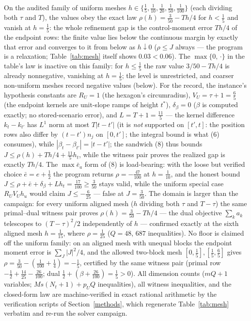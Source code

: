 \documentclass[10pt,twocolumn]{article}
\theoremstyle{plain}
\theoremstyle{definition}
\theoremstyle{remark}
\begin{document}
On the audited family of uniform meshes \(h \in \{\tfrac15,
\tfrac1{10}, \tfrac1{20}, \tfrac1{50}, \tfrac1{100}\}\) (each dividing
both \(\tau\) and \(T\)), the values obey the exact law \(\rho(h) =
\tfrac{3}{50} - Th/4\) for \(h < \tfrac15\) and vanish at \(h =
\tfrac15\): the whole refinement gap is the control-moment error \(Th/4\)
of the endpoint rows: the finite value lies below the continuous margin by
exactly that error and converges to it from below as \(h \downarrow 0\)
(\(\rho \le J\) always --- the program is a relaxation; Table~\ref{tab:mesh}
itself shows \(0.03 < 0.06\)). The \(\max\{0,\,\cdot\}\) in the
table's law is inactive on this family: for \(h \le \tfrac15\) the raw
value \(3/50 - Th/4\) is already nonnegative, vanishing at
\(h = \tfrac15\); the level is unrestricted, and coarser non-uniform
meshes record negative values (below).
For the record, the instance's hypothesis constants are
\(R_U = 1\) (the hexagon's circumradius), \(V_U = \tau + 1 = \tfrac65\)
(the endpoint kernels are unit-slope ramps of height \(t^{*}\)),
\(\delta_\beta = 0\) (\(\beta\) is computed exactly; no stored-scenario
error), and \(L = T + 1 = \tfrac{11}{5}\) --- the kernel difference \(k_t - k_{t'}\) has \(L^1\) norm at most
\(T|t - t'|\) (it is \emph{not} supported on \([t', t]\): the position
rows also differ by \((t - t')n_j\) on \([0, t']\); the integral bound is
what (6) consumes), while \(|\beta_t - \beta_{t'}| = |t - t'|\); the
sandwich (8) thus bounds \(J \le \rho(h) + Th/4 + \tfrac{11}{5}
h_t\), while the witness pair proves the realized gap is exactly
\(Th/4\). The \(\max \bar{e}_a\) form of (8) is load-bearing: with the
loose but verified choice \(\bar{e} = e + \tfrac12\) the program returns
\(\rho = -\tfrac{47}{100}\) at \(h = \tfrac1{10}\), and the honest
bound \(J \le \rho + \bar{e} + \delta_\beta + L h_t = \tfrac{17}{100}
\ge \tfrac3{50}\) stays valid, while the uniform special case
\(R_U V_U h_u\) would claim \(J \le -\tfrac{6}{25}\) --- false at
\(J = \tfrac3{50}\). The domain is larger than the campaign: for every uniform aligned mesh
(\(h\) dividing both \(\tau\) and \(T - \tau\)) the same primal--dual
witness pair proves \(\rho(h) = \tfrac{3}{50} - Th/4\) --- the dual
objective \(\sum_k a_k\) telescopes to \((T-\tau)^2/2\) independently of
\(h\) --- confirmed exactly at the sixth aligned mesh \(h = \tfrac1{15}\),
where \(\rho = \tfrac1{25}\) (\(Q = 48\), \(687\) inequalities). No
floor is claimed off the uniform family: on an aligned mesh with unequal
blocks the endpoint moment error is \(\sum_J |J|^2/4\), and the allowed
two-block mesh \([0, \tfrac15], [\tfrac15, \tfrac65]\) gives
\(\rho = \tfrac3{50} - (\tfrac1{100} + \tfrac14) = -\tfrac15\),
certified by the same witness pair (primal row
\(-\tfrac12 + \tfrac{14}{25} - \tfrac{26}{100}\); dual
\(\tfrac12 + (\beta + \tfrac{26}{100}) = \tfrac15 > 0\)). All dimension counts
(\(mQ + 1\) variables; \(Ms(N_t{+}1) + p_U Q\) inequalities), all witness
inequalities, and the closed-form law are machine-verified in exact rational
arithmetic by the verification scripts of Section~\ref{methods}, which
regenerate Table~\ref{tab:mesh} verbatim and re-run the solver campaign.
\end{document}
